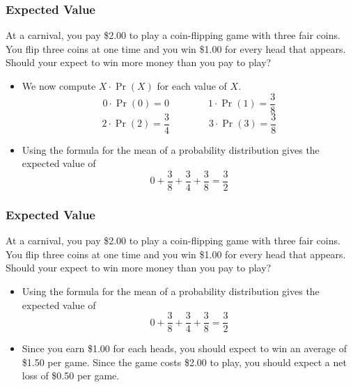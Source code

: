 \documentclass[Lecture.tex]{subfiles}
\begin{document}
\begin{frame}
\frametitle{Expected Value}
\vspace*{-.15in}
\begin{example}
At a carnival, you pay \$2.00 to play a coin-flipping game with three fair coins.  You flip three coins at one time and you win \$1.00 for every head that appears.  Should your expect to win more money than you pay to play?
\end{example}
\begin{itemize}
\item We now compute $X\cdot\Pr(X)$ for each value of $X$.
$$0\cdot\Pr(0)=0\qquad\qquad 1\cdot\Pr(1)=\frac{3}{8}$$
$$2\cdot\Pr(2)=\frac{3}{4}\qquad\qquad 3\cdot\Pr(3)=\frac{3}{8}$$\pause
\item Using the formula for the mean of a probability distribution gives the expected value of 
$$0+\frac{3}{8}+\frac{3}{4}+\frac{3}{8}=\frac{3}{2}$$
\end{itemize}
\end{frame}

\begin{frame}
\frametitle{Expected Value}
\vspace*{-.15in}
\begin{example}
At a carnival, you pay \$2.00 to play a coin-flipping game with three fair coins.  You flip three coins at one time and you win \$1.00 for every head that appears.  Should your expect to win more money than you pay to play?
\end{example}
\begin{itemize}
\item Using the formula for the mean of a probability distribution gives the expected value of 
$$0+\frac{3}{8}+\frac{3}{4}+\frac{3}{8}=\frac{3}{2}$$\pause
\item Since you earn \$1.00 for each heads, you should expect to win an average of \$1.50 per game.  Since the game costs \$2.00 to play, you should expect a net loss of \$0.50 per game.
\end{itemize}
\end{frame}
\end{document}
